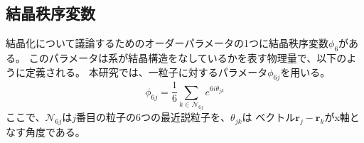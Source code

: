 \documentclass[/Users/ikedahajime/GitHub/reserch/master_report/thesis]{subfiles}
\begin{document}
\subsection{結晶秩序変数}
結晶化について議論するためのオーダーパラメータの1つに結晶秩序変数$\phi_6$がある。
このパラメータは系が結晶構造をなしているかを表す物理量で、以下のように定義される。
本研究では、一粒子に対するパラメータ$\phi_{6j}$を用いる。
\begin{equation}
    \phi_{6j}=\frac{1}{6}\sum_{k\in \mathcal{N}_{6j}} e^{6i\theta_{jk}}
\end{equation}
ここで、$\mathcal{N}_{6j}$は$j$番目の粒子の6つの最近説粒子を、$\theta_{jk}$は
ベクトル$\bm{r}_j-\bm{r}_k$がx軸となす角度である。
\end{document}
